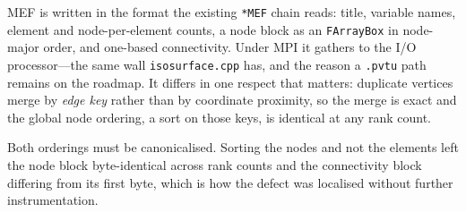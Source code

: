 MEF is written in the format the existing \texttt{*MEF} chain reads: title,
variable names, element and node-per-element counts, a node block as an
\texttt{FArrayBox} in node-major order, and one-based connectivity. Under MPI it
gathers to the I/O processor---the same wall \texttt{isosurface.cpp} has, and the
reason a \texttt{.pvtu} path remains on the roadmap. It differs in one respect
that matters: duplicate vertices merge by \emph{edge key} rather than by
coordinate proximity, so the merge is exact and the global node ordering, a sort
on those keys, is identical at any rank count.

Both orderings must be canonicalised. Sorting the nodes and not the elements
left the node block byte-identical across rank counts and the connectivity block
differing from its first byte, which is how the defect was localised without
further instrumentation.
